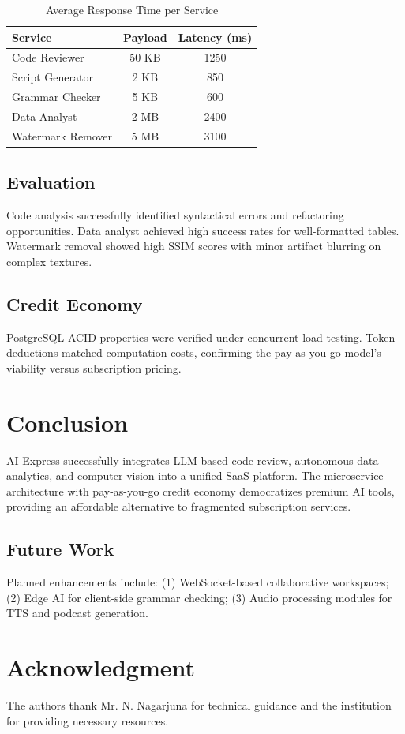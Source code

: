 \documentclass[conference]{IEEEtran}
\begin{document}
\begin{table}[htbp]
\caption{Average Response Time per Service}
\begin{center}
\begin{tabular}{|l|c|c|}
\hline
\textbf{Service} & \textbf{Payload} & \textbf{Latency (ms)} \\
\hline
Code Reviewer & 50 KB & 1250 \\
Script Generator & 2 KB & 850 \\
Grammar Checker & 5 KB & 600 \\
Data Analyst & 2 MB & 2400 \\
Watermark Remover & 5 MB & 3100 \\
\hline
\end{tabular}
\label{tab:latency}
\end{center}
\end{table}

\subsection{Evaluation}
Code analysis successfully identified syntactical errors and refactoring opportunities. Data analyst achieved high success rates for well-formatted tables. Watermark removal showed high SSIM scores with minor artifact blurring on complex textures.

\subsection{Credit Economy}
PostgreSQL ACID properties were verified under concurrent load testing. Token deductions matched computation costs, confirming the pay-as-you-go model's viability versus subscription pricing.

\section{Conclusion}
AI Express successfully integrates LLM-based code review, autonomous data analytics, and computer vision into a unified SaaS platform. The microservice architecture with pay-as-you-go credit economy democratizes premium AI tools, providing an affordable alternative to fragmented subscription services.

\subsection{Future Work}
Planned enhancements include: (1) WebSocket-based collaborative workspaces; (2) Edge AI for client-side grammar checking; (3) Audio processing modules for TTS and podcast generation.

\section*{Acknowledgment}
The authors thank Mr. N. Nagarjuna for technical guidance and the institution for providing necessary resources.



\end{document}
